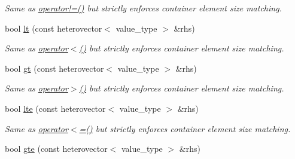 \begin{DoxyCompactItemize}
\begin{DoxyCompactList}\small\item\em Same as \hyperlink{classheterogeneous_1_1heterovector_3_01_t_01_4_a4bd5954785ffef4177f5d6086fde6ea3}{operator!=()} but strictly enforces container element size matching. \end{DoxyCompactList}\item 
\hypertarget{classheterogeneous_1_1heterovector_3_01_t_01_4_a47065909d38eb7408b287ae52029b4d1}{}bool \hyperlink{classheterogeneous_1_1heterovector_3_01_t_01_4_a47065909d38eb7408b287ae52029b4d1}{lt} (const heterovector$<$ value\+\_\+type $>$ \&rhs)\label{classheterogeneous_1_1heterovector_3_01_t_01_4_a47065909d38eb7408b287ae52029b4d1}

\begin{DoxyCompactList}\small\item\em Same as \hyperlink{classheterogeneous_1_1heterovector_3_01_t_01_4_a9a6a4f49a2e2b6156545792875ba3b71}{operator$<$()} but strictly enforces container element size matching. \end{DoxyCompactList}\item 
\hypertarget{classheterogeneous_1_1heterovector_3_01_t_01_4_a5cb4f5cd4fca90b4fede9e74909b2968}{}bool \hyperlink{classheterogeneous_1_1heterovector_3_01_t_01_4_a5cb4f5cd4fca90b4fede9e74909b2968}{gt} (const heterovector$<$ value\+\_\+type $>$ \&rhs)\label{classheterogeneous_1_1heterovector_3_01_t_01_4_a5cb4f5cd4fca90b4fede9e74909b2968}

\begin{DoxyCompactList}\small\item\em Same as \hyperlink{classheterogeneous_1_1heterovector_3_01_t_01_4_a541e9825eaba04c151e10a68436b79bb}{operator$>$()} but strictly enforces container element size matching. \end{DoxyCompactList}\item 
\hypertarget{classheterogeneous_1_1heterovector_3_01_t_01_4_ab92baa4fb86fbb13208b8cff53e09025}{}bool \hyperlink{classheterogeneous_1_1heterovector_3_01_t_01_4_ab92baa4fb86fbb13208b8cff53e09025}{lte} (const heterovector$<$ value\+\_\+type $>$ \&rhs)\label{classheterogeneous_1_1heterovector_3_01_t_01_4_ab92baa4fb86fbb13208b8cff53e09025}

\begin{DoxyCompactList}\small\item\em Same as \hyperlink{classheterogeneous_1_1heterovector_3_01_t_01_4_a3288bba9a9e8b716fe532ec4dabefd99}{operator$<$=()} but strictly enforces container element size matching. \end{DoxyCompactList}\item 
\hypertarget{classheterogeneous_1_1heterovector_3_01_t_01_4_a4101bd2cf5f0017dff0e17ee1c20aa93}{}bool \hyperlink{classheterogeneous_1_1heterovector_3_01_t_01_4_a4101bd2cf5f0017dff0e17ee1c20aa93}{gte} (const heterovector$<$ value\+\_\+type $>$ \&rhs)\label{classheterogeneous_1_1heterovector_3_01_t_01_4_a4101bd2cf5f0017dff0e17ee1c20aa93}


\end{DoxyCompactItemize}
